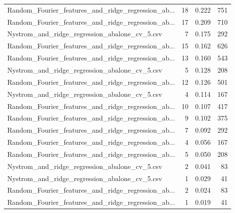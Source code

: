 \begin{tabularx}{\textwidth}{lrrr}
Random\_Fourier\_features\_and\_ridge\_regression\_ab... &       18 &               0.222 &           751 \\
Random\_Fourier\_features\_and\_ridge\_regression\_ab... &       17 &               0.209 &           710 \\
     Nystrom\_and\_ridge\_regression\_abalone\_cv\_5.csv &        7 &               0.175 &           292 \\
Random\_Fourier\_features\_and\_ridge\_regression\_ab... &       15 &               0.162 &           626 \\
Random\_Fourier\_features\_and\_ridge\_regression\_ab... &       13 &               0.160 &           543 \\
     Nystrom\_and\_ridge\_regression\_abalone\_cv\_5.csv &        5 &               0.128 &           208 \\
Random\_Fourier\_features\_and\_ridge\_regression\_ab... &       12 &               0.126 &           501 \\
     Nystrom\_and\_ridge\_regression\_abalone\_cv\_5.csv &        4 &               0.114 &           167 \\
Random\_Fourier\_features\_and\_ridge\_regression\_ab... &       10 &               0.107 &           417 \\
Random\_Fourier\_features\_and\_ridge\_regression\_ab... &        9 &               0.102 &           375 \\
Random\_Fourier\_features\_and\_ridge\_regression\_ab... &        7 &               0.092 &           292 \\
Random\_Fourier\_features\_and\_ridge\_regression\_ab... &        4 &               0.056 &           167 \\
Random\_Fourier\_features\_and\_ridge\_regression\_ab... &        5 &               0.050 &           208 \\
     Nystrom\_and\_ridge\_regression\_abalone\_cv\_5.csv &        2 &               0.041 &            83 \\
     Nystrom\_and\_ridge\_regression\_abalone\_cv\_5.csv &        1 &               0.029 &            41 \\
Random\_Fourier\_features\_and\_ridge\_regression\_ab... &        2 &               0.024 &            83 \\
Random\_Fourier\_features\_and\_ridge\_regression\_ab... &        1 &               0.019 &            41 \\
\bottomrule
\end{tabularx}
